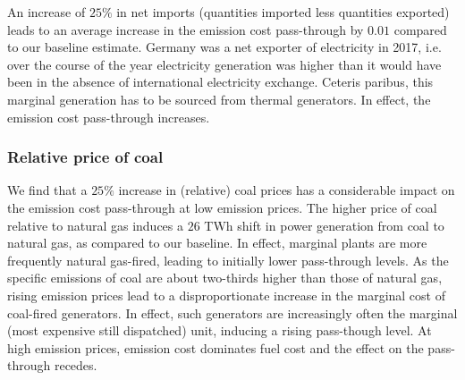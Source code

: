 \documentclass[preprint, 12pt, authoryear]{elsarticle}
\begin{document}
An increase of $25\%$ in net imports (quantities imported less quantities exported) leads to an average increase in the emission cost pass-through by $0.01$ compared to our baseline estimate.
Germany was a net exporter of electricity in 2017, i.e. over the course of the year electricity generation was higher than it would have been in the absence of international electricity exchange. 
Ceteris paribus, this marginal generation has to be sourced from thermal generators. In effect, the emission cost pass-through increases.

\subsubsection*{Relative price of coal}
We find that a $25\%$ increase in (relative) coal prices has a considerable impact on the emission cost pass-through at low emission prices. The higher price of coal relative to natural gas induces a $26$ TWh shift in power generation from coal to natural gas, as compared to our baseline. In effect, marginal plants are more frequently natural gas-fired, leading to initially lower pass-through levels. As the specific  emissions of coal are about two-thirds higher than those of natural gas, rising emission prices lead to a disproportionate increase in the marginal cost of coal-fired generators. In effect, such generators are increasingly often the marginal (most expensive still dispatched) unit, inducing a rising pass-though level. At high emission prices, emission cost dominates fuel cost and the effect on the pass-through recedes.
\end{document}

